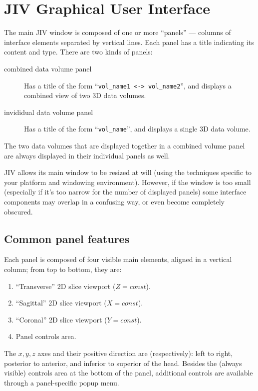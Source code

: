 %
%
%

\section{JIV Graphical User Interface}
\label{sec:jiv-gui}

The main JIV window is composed of one or more ``panels'' --- columns
of interface elements separated by vertical lines.  Each panel has a
title indicating its content and type. There are two kinds of panels:
\begin{description}
\item[combined data volume panel] Has a title of the form
  ``\verb+vol_name1 <-> vol_name2+'', and displays a combined view of
  two 3D data volumes.
\item[invididual data volume panel] Has a title of the form
  ``\verb+vol_name+'', and displays a single 3D data volume.
\end{description}
The two data volumes that are displayed together in a combined volume
panel are always displayed in their individual panels as well.

JIV allows its main window to be resized at will (using the techniques
specific to your platform and windowing environment). However, if the
window is too small (especially if it's too narrow for the number of
displayed panels) some interface components may overlap in a confusing
way, or even become completely obscured.

\subsection{Common panel features}
\label{sec:common-features}
Each panel is composed of four visible main elements, aligned in a
vertical column; from top to bottom, they are:
\begin{enumerate}
\item ``Transverse'' 2D slice viewport ($Z = const$).
\item ``Sagittal'' 2D slice viewport ($X = const$).
\item ``Coronal'' 2D slice viewport ($Y = const$).
\item Panel controls area.
\end{enumerate}
The $x, y, z$ axes and their positive direction are (respectively):
left to right, posterior to anterior, and inferior to superior of the
head.  Besides the (always visible) controls area at the bottom of the
panel, additional controls are available through a panel-specific
popup menu.


